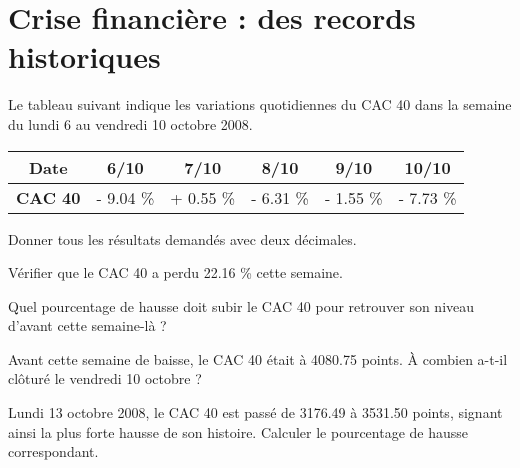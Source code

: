 \section{Crise financière : des records historiques}

Le tableau suivant indique les variations quotidiennes du CAC 40 dans la semaine du lundi 6 au vendredi 10 octobre 2008.

\begin{center}
	\begin{tabular}{|@{\ }c@{\ }|@{\ }c@{\ }|@{\ }c@{\ }|@{\ }c@{\ }|@{\ }c@{\ }|@{\ }c@{\ }|}
		\hline
		\textbf{Date}   & \textbf{6/10}   & \textbf{7/10}   & \textbf{8/10}   & \textbf{9/10}  & \textbf{10/10} \\ \hline
		\textbf{CAC 40} & - \num{9.04} \% & + \num{0.55} \% & - \num{6.31} \% & - \num{1.55} \% & - \num{7.73} \%  \\ \hline
	\end{tabular}
\end{center}

Donner tous les résultats demandés avec deux décimales.

\begin{questions}
	\question Vérifier que le CAC 40 a perdu \num{22.16} \% cette semaine.
	
	\question Quel pourcentage de hausse doit subir le CAC 40 pour retrouver son niveau d'avant cette semaine-là ?
	
	\question Avant cette semaine de baisse, le CAC 40 était à \num{4080.75} points. \`A combien a-t-il clôturé le vendredi 10 octobre ?
	
	\question Lundi 13 octobre 2008, le CAC 40 est passé de \num{3176.49} à \num{3531.50} points, signant ainsi la plus forte hausse de son histoire. 
	Calculer le pourcentage de hausse correspondant.  
\end{questions} 
